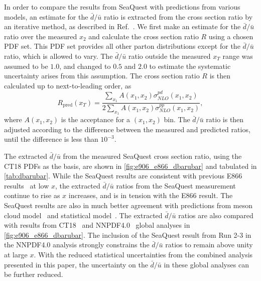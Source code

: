 \documentclass[reprint,aps,unsortedaddress,superscriptaddress,prl,floatfix,showpacs,linenumbers,final]{revtex4-2}
\begin{document}
In order to compare the results from SeaQuest with predictions from various models,
an estimate for the $\bar{d}/\bar{u}$ ratio is extracted from the cross section ratio by
an iterative method, as described in Ref.~\cite{dove2021}.
We first make an estimate for the $\bar{d}/\bar{u}$ ratio over the measured $x_2$
and calculate the cross section ratio $R$ using a chosen PDF set.
This PDF set provides all other parton distributions except for the $\bar{d}/\bar{u}$ ratio,
which is allowed to vary.
The $\bar{d}/\bar{u}$ ratio outside the measured $x_T$ range was assumed to be $1.0$,
and changed to $0.5$ and $2.0$ to estimate the systematic uncertainty arises from this assumption.
The cross section ratio $R$ is then calculated up to next-to-leading order, as
\begin{equation}
	R_{\mathrm{pred}}\left(x_T\right)  = \frac{\sum_{x_1} A\left(x_1, x_2\right)\sigma^{pd}_{NLO}\left(x_1, x_2\right)}{2\sum_{x_1} A\left(x_1, x_2\right)\sigma^{pp}_{NLO}\left(x_1, x_2\right)},
\end{equation}
where $A\left(x_1,x_2\right)$ is the acceptance for a $\left(x_1, x_2\right)$ bin.
The $\bar{d}/\bar{u}$ ratio is then adjusted according to the difference between
the measured and predicted ratios, until the difference is less than $10^{-3}$.

The extracted $\bar{d}/\bar{u}$ from the measured SeaQuest cross section ratio,
using the CT18 PDFs as the basis, are shown in \cref{fig:e906_e866_dbarubar}
and tabulated in \cref{tab:dbarubar}.
While the SeaQuest results are consistent with previous E866 results~\cite{towell2001} at low $x$,
the extracted $\bar{d}/\bar{u}$ ratios from the SeaQuest measurement continue to rise as $x$ increases,
and is in tension with the E866 result.
The SeaQuest results are also in much better agreement with predictions from meson cloud model~\cite{alberg2022}
and statistical model~\cite{soffer2019}.
The extracted $\bar{d}/\bar{u}$ ratios are also compared with results from CT18~\cite{hou2021} and NNPDF4.0~\cite{ball2022a}
global analyses in \cref{fig:e906_e866_dbarubar}.
The inclusion of the SeaQuest result from Run 2-3 in the NNPDF4.0 analysis strongly constrains the $\bar{d}/\bar{u}$ ratios
to remain above unity at large $x$.
With the reduced statistical uncertainties from the combined analysis presented in this paper,
the uncertainty on the $\bar{d}/\bar{u}$ in these global analyses can be further reduced.
\end{document}
